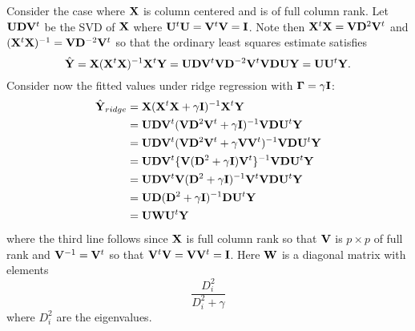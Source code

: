 Consider the case where $\bX$ is column centered and is of full column rank. 
Let $\bU \bD \bV^t$ be the SVD of $\bX$ where $\bU^t \bU = \bV ^t \bV = \bI$. 
Note then $\xtx = \bV \bD^2 \bV^t$ and $\xtxinv = \bV \bD^{-2} \bV^t$ so that
the ordinary least squares estimate satisfies
$$
\hat \bY = \bX \xtxinv \bX^t \bY = \bU \bD \bV^t \bV \bD^{-2} \bV^t \bV \bD \bU \bY = \bU \bU^t \bY.
$$
Consider now the fitted values under ridge regression with $\bGamma = \gamma \bI$:
\begin{align*}
\hat \bY_{ridge} 
& = \bX (\xtx + \gamma \bI)^{-1} \bX^t \bY \\
& = \bU \bD \bV^t (\bV \bD^2 \bV^t + \gamma \bI)^{-1} \bV \bD \bU^t \bY \\
& = \bU \bD \bV^t (\bV \bD^2 \bV^t + \gamma \bV \bV^t)^{-1} \bV \bD \bU^t \bY \\
& = \bU \bD \bV^t \{\bV (\bD^2 + \gamma \bI) \bV^t\}^{-1} \bV \bD \bU^t \bY \\
& = \bU \bD \bV^t \bV (\bD^2 + \gamma \bI)^{-1} \bV^t \bV \bD \bU^t \bY \\
& = \bU \bD (\bD^2 + \gamma \bI)^{-1} \bD \bU^t \bY\\
& = \bU \bW \bU^t \bY
\end{align*}
where the third line follows since $\bX$ is full column rank so that $\bV$ is $p\times p$ of full rank
and $\bV^{-1} = \bV^t$ so that $\bV^t \bV = \bV \bV^t = \bI$. Here $\bW$ is a diagonal matrix with elements
$$
\frac{D_i^2}{D_i^2 + \gamma}
$$
where $D_i^2$ are the eigenvalues. 

